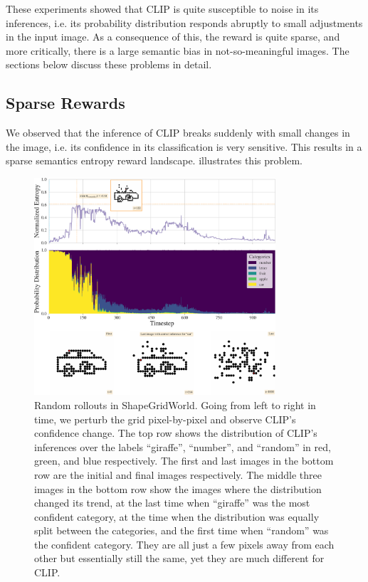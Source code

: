These experiments showed that CLIP is quite susceptible to noise in its inferences, i.e. its probability distribution responds abruptly to small adjustments in the input image.
As a consequence of this, the reward is quite sparse, and more critically, there is a large semantic bias in not-so-meaningful images.
The sections below discuss these problems in detail.

\subsection{Sparse Rewards} %
\label{sec:sparse-rewards}

We observed that the inference of CLIP breaks suddenly with small changes in the image, i.e. its confidence in its classification is very sensitive.
This results in a sparse semantics entropy reward landscape.
 illustrates this problem.

\begin{figure}[h]
    \centering
    \includegraphics[width=0.8\textwidth]{images/sparse_rewards.pdf}
    \caption[Random rollouts in ShapeGridWorld.]{Random rollouts in ShapeGridWorld. Going from left to right in time, we perturb the grid pixel-by-pixel and observe CLIP's confidence change. The top row shows the distribution of CLIP's inferences over the labels ``giraffe'', ``number'', and ``random'' in red, green, and blue respectively. The first and last images in the bottom row are the initial and final images respectively.
    The middle three images in the bottom row show the images where the distribution changed its trend, at the last time when ``giraffe'' was the most confident category, at the time when the distribution was equally split between the categories, and the first time when ``random'' was the confident category.
    They are all just a few pixels away from each other but essentially still the same, yet they are much different for CLIP.}
    \label{fig:sparse-rewards}
    
\end{figure}

